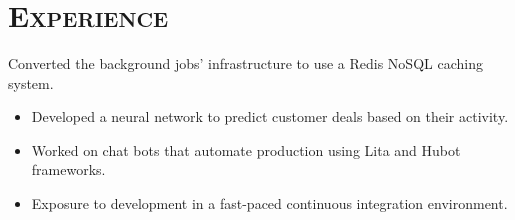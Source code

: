 \begin{resume}
  \begin{formatb}
    \\
    \\
    \body\\
  \end{formatb}

  \section{\textsc{Experience}}
  \begin{position}
    Converted the background jobs' infrastructure to use a Redis NoSQL caching system.
    \begin{itemize}
      \setlength\itemsep{0em}
      \item Developed a neural network to predict customer deals based on their activity.
      \item Worked on chat bots that automate production using Lita and Hubot frameworks.
      \item Exposure to development in a fast-paced continuous integration environment.
    \end{itemize}
  \end{position}



\end{resume}
